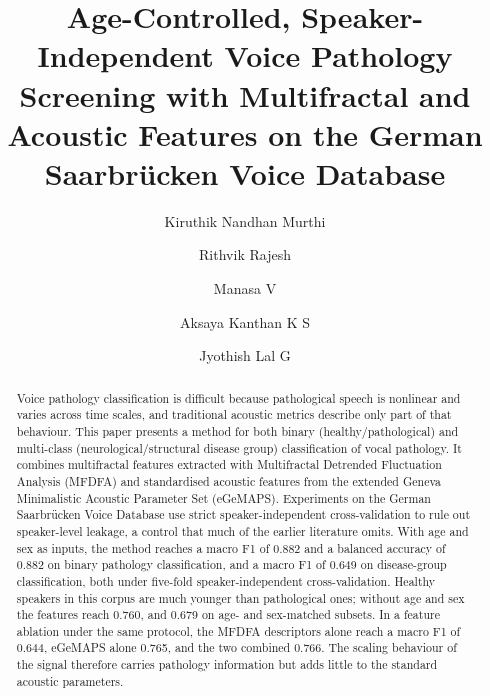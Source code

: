 \documentclass[runningheads]{llncs}
\begin{document}
\title{Age-Controlled, Speaker-Independent Voice Pathology Screening with Multifractal and Acoustic Features on the German Saarbr\"ucken Voice Database}
\author{Kiruthik Nandhan Murthi \and
Rithvik Rajesh \and
Manasa V \and
Aksaya Kanthan K S \and
Jyothish Lal G}
\maketitle            
\begin{abstract}
Voice pathology classification is difficult because pathological speech is nonlinear and varies across time scales, and traditional acoustic metrics describe only part of that behaviour. This paper presents a method for both binary (healthy/pathological) and multi-class (neurological/structural disease group) classification of vocal pathology. It combines multifractal features extracted with Multifractal Detrended Fluctuation Analysis (MFDFA) and standardised acoustic features from the extended Geneva Minimalistic Acoustic Parameter Set (eGeMAPS). Experiments on the German Saarbrücken Voice Database use strict speaker-independent cross-validation to rule out speaker-level leakage, a control that much of the earlier literature omits. With age and sex as inputs, the method reaches a macro F1 of 0.882 and a balanced accuracy of 0.882 on binary pathology classification, and a macro F1 of 0.649 on disease-group classification, both under five-fold speaker-independent cross-validation. Healthy speakers in this corpus are much younger than pathological ones; without age and sex the features reach 0.760, and 0.679 on age- and sex-matched subsets. In a feature ablation under the same protocol, the MFDFA descriptors alone reach a macro F1 of 0.644, eGeMAPS alone 0.765, and the two combined 0.766. The scaling behaviour of the signal therefore carries pathology information but adds little to the standard acoustic parameters.

\end{abstract}
\end{document}
